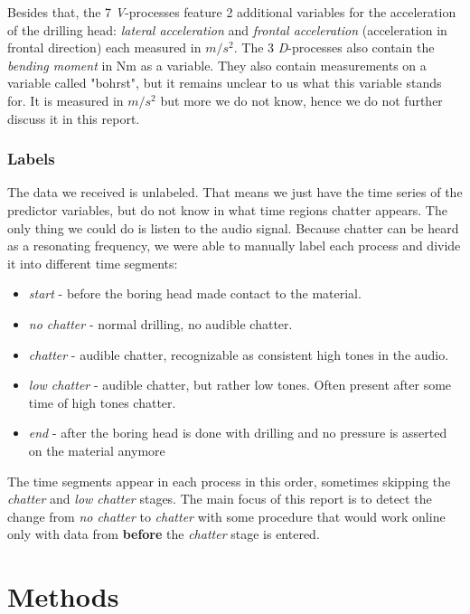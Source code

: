 \documentclass[12 pt]{scrartcl}
\begin{document}
Besides that, the 7 \emph{V}-processes feature 2 additional variables for the acceleration of the drilling head: \emph{lateral acceleration} and \emph{frontal acceleration} (acceleration in frontal direction) each measured in $m/s^2$.
The 3 \emph{D}-processes also contain the \emph{bending moment} in Nm as a variable. They also contain measurements on a variable called "bohrst", but it remains unclear to us what this variable stands for. It is measured in $m/s^2$ but more we do not know, hence we do not further discuss it in this report.

\subsubsection{Labels} \label{labels}

The data we received is unlabeled. That means we just have the time series of the predictor variables, but do not know in what time regions chatter appears. The only thing we could do is listen to the audio signal. Because chatter can be heard as a resonating frequency, we were able to manually label each process and divide it into different time segments:

\begin{itemize}
  \item \emph{start} - before the boring head made contact to the material.
  \item \emph{no chatter} - normal drilling, no audible chatter.
  \item \emph{chatter} - audible chatter, recognizable as consistent high tones in the audio.
  \item \emph{low chatter} - audible chatter, but rather low tones. Often present after some time of high tones chatter.
  \item \emph{end} - after the boring head is done with drilling and no pressure is asserted on the material anymore
\end{itemize}

The time segments appear in each process in this order, sometimes skipping the \emph{chatter} and \emph{low chatter} stages.
The main focus of this report is to detect the change from \emph{no chatter} to \emph{chatter} with some procedure that would work online only with data from \textbf{before} the \emph{chatter} stage is entered.

\section{Methods}
\end{document}
